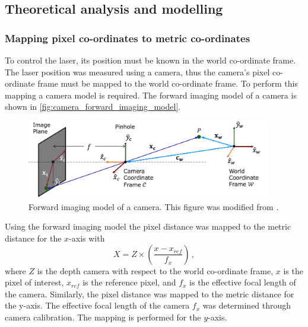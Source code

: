 \subsection{Theoretical analysis and modelling}

\subsubsection{Mapping pixel co-ordinates to metric co-ordinates}
To control the laser, its position must be known in the world co-ordinate frame. The laser position was measured using a camera, thus the camera's pixel co-ordinate frame must be mapped to the world co-ordinate frame. To perform this mapping a camera model is required. The forward imaging model of a camera is shown in \autoref{fig:camera_forward_imaging_model}.
\begin{figure}[!htb]
  \centering
  \includegraphics[width=0.95\textwidth]{figures/camera/wit_forward_imaging_model.png}
  \caption{Forward imaging model of a camera. This figure was modified from \cite{Nayar}.}
  \label{fig:camera_forward_imaging_model}
\end{figure}

Using the forward imaging model the pixel distance was mapped to the metric distance for the $x$-axis with
\begin{equation}
  X = Z \times \left( \frac{x - x_{ref}}{f_x} \right)\,,
  \label{eq:pixel_to_metric}
\end{equation}
where $Z$ is the depth camera with respect to the world co-ordinate frame, $x$ is the pixel of interest, $x_{ref}$ is the reference pixel, and $f_x$ is the effective focal length of the camera. Similarly, the pixel distance was mapped to the metric distance for the y-axis. The effective focal length of the camera $f_x$ was determined through camera calibration. The mapping is performed for the $y$-axis.


